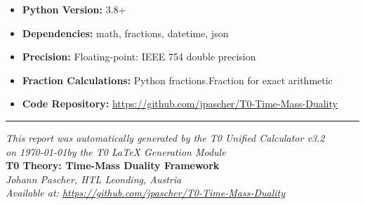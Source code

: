 \documentclass[11pt,a4paper]{article}
\begin{document}
	\begin{itemize}
		\item \textbf{Python Version:} 3.8+
		\item \textbf{Dependencies:} math, fractions, datetime, json
		\item \textbf{Precision:} Floating-point: IEEE 754 double precision
		\item \textbf{Fraction Calculations:} Python fractions.Fraction for exact arithmetic
		\item \textbf{Code Repository:} \url{https://github.com/jpascher/T0-Time-Mass-Duality}
	\end{itemize}
	
	\vfill
	
	\begin{center}
		\hrule
		\vspace{0.5cm}
		\textit{This report was automatically generated by the T0 Unified Calculator v3.2}\\
		\textit{on \today\space by the T0 LaTeX Generation Module}\\
		\vspace{0.3cm}
		\textbf{T0 Theory: Time-Mass Duality Framework}\\
		\textit{Johann Pascher, HTL Leonding, Austria}\\
		\textit{Available at: \url{https://github.com/jpascher/T0-Time-Mass-Duality}}
	\end{center}
	
\end{document}
